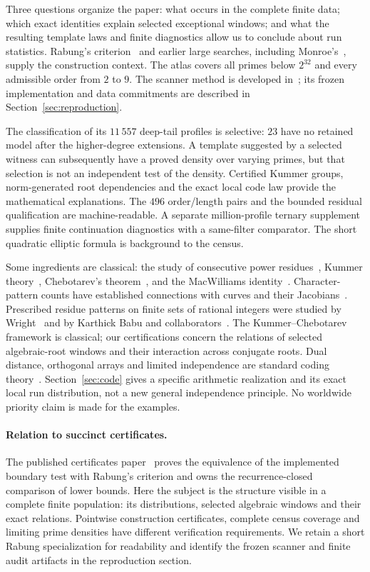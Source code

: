 \documentclass[11pt]{article}
\theoremstyle{definition}\newtheorem{definition}[theorem]{Definition}
\begin{document}
Three questions organize the paper: what occurs in the complete finite
data; which exact identities explain selected exceptional windows; and
what the resulting template laws and finite diagnostics allow us to
conclude about run statistics. Rabung's criterion~\cite{rabung} and earlier
large searches, including Monroe's~\cite{monroe}, supply the construction
context. The atlas covers all primes below $2^{32}$ and every admissible
order from $2$ to $9$. The scanner method is developed in~\cite{gpumethod};
its frozen implementation and data commitments are described
in Section~\ref{sec:reproduction}.

The classification of its $11\,557$ deep-tail profiles is selective:
$23$ have no retained model after the higher-degree extensions. A template
suggested by a selected witness can subsequently have a proved density
over varying primes, but that selection is not an independent test of
the density. Certified Kummer groups, norm-generated root dependencies
and the exact local code law provide the mathematical explanations.
The $496$ order/length pairs and the bounded residual qualification are
machine-readable. A separate million-profile ternary supplement supplies
finite continuation diagnostics with a same-filter comparator. The short
quadratic elliptic formula is background to the census.

Some ingredients are classical: the study of consecutive power
residues~\cite{lehmer}, Kummer theory~\cite{milneFT}, Chebotarev's
theorem~\cite{milneANT}, and the MacWilliams identity~\cite{macwilliams}.
Character-pattern counts have established connections with curves
and their Jacobians~\cite{patterns}. Prescribed residue patterns on
finite sets of rational integers were studied by Wright~\cite{wright07,wright08}
and by Karthick Babu and collaborators~\cite{babu24,babu25}.
The Kummer--Chebotarev framework is classical; our certifications
concern the relations of selected algebraic-root windows and their
interaction across conjugate roots. Dual distance, orthogonal arrays
and limited independence are standard coding theory~\cite{delsarte,cameron}.
Section~\ref{sec:code} gives a specific arithmetic realization and
its exact local run distribution, not a new general independence
principle. No worldwide priority claim is made for the examples.

\paragraph{Relation to succinct certificates.}
The published certificates paper~\cite{boundsv2} proves the equivalence of
the implemented boundary test with Rabung's criterion and owns the
recurrence-closed comparison of lower bounds. Here the subject is the
structure visible in a complete finite population: its distributions,
selected algebraic windows and their exact relations. Pointwise
construction certificates, complete census coverage and limiting prime
densities have different verification requirements. We retain a short
Rabung specialization for readability and identify the frozen scanner
and finite audit artifacts in the reproduction section.
\end{document}
